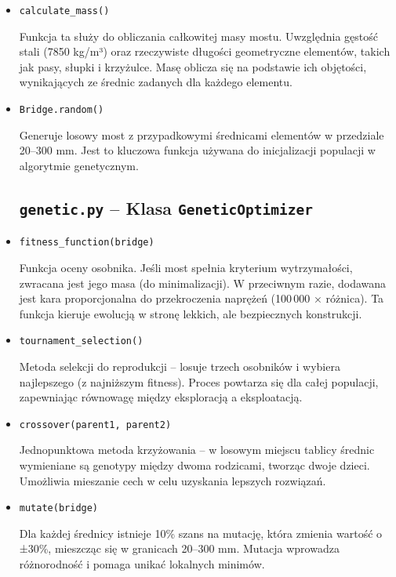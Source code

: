 \documentclass[12pt,a4paper]{article}
\begin{document}
 \begin{itemize}
\item {\texttt{calculate\_mass()}}

Funkcja ta służy do obliczania całkowitej masy mostu. Uwzględnia gęstość stali (7850 kg/m³) oraz rzeczywiste długości geometryczne elementów, takich jak pasy, słupki i krzyżulce. Masę oblicza się na podstawie ich objętości, wynikających ze średnic zadanych dla każdego elementu.

 

\item {\texttt{Bridge.random()}}

Generuje losowy most z przypadkowymi średnicami elementów w przedziale 20–300 mm. Jest to kluczowa funkcja używana do inicjalizacji populacji w algorytmie genetycznym.

\subsection{\texttt{genetic.py} – Klasa \texttt{GeneticOptimizer}}

\item {\texttt{fitness\_function(bridge)}}

Funkcja oceny osobnika. Jeśli most spełnia kryterium wytrzymałości, zwracana jest jego masa (do minimalizacji). W przeciwnym razie, dodawana jest kara proporcjonalna do przekroczenia naprężeń (100\,000 × różnica). Ta funkcja kieruje ewolucją w stronę lekkich, ale bezpiecznych konstrukcji.

\item {\texttt{tournament\_selection()}}

Metoda selekcji do reprodukcji – losuje trzech osobników i wybiera najlepszego (z najniższym fitness). Proces powtarza się dla całej populacji, zapewniając równowagę między eksploracją a eksploatacją.

\item {\texttt{crossover(parent1, parent2)}}

Jednopunktowa metoda krzyżowania – w losowym miejscu tablicy średnic wymieniane są genotypy między dwoma rodzicami, tworząc dwoje dzieci. Umożliwia mieszanie cech w celu uzyskania lepszych rozwiązań.

\item{\texttt{mutate(bridge)}}

Dla każdej średnicy istnieje 10\% szans na mutację, która zmienia wartość o ±30\%, mieszcząc się w granicach 20–300 mm. Mutacja wprowadza różnorodność i pomaga unikać lokalnych minimów.


\end{itemize}
\end{document}
